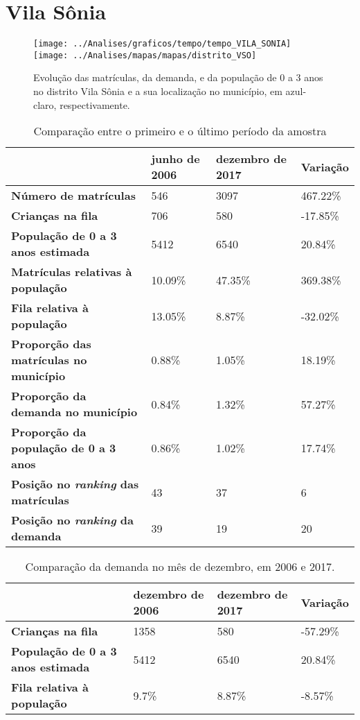 \section{Vila Sônia}
\begin{figure}[H]
\centering
\texttt{[image: ../Analises/graficos/tempo/tempo\_VILA\_SONIA]}
\texttt{[image: ../Analises/mapas/mapas/distrito\_VSO]}
\caption{Evolução das matrículas, da demanda, e da população de 0 a 3 anos no distrito Vila Sônia e a sua localização no município, em azul-claro, respectivamente.}
\end{figure}
\begin{table}[H]
\begin{tabular}{l|l|l|l}
\textbf{}                                      & \textbf{junho de 2006}       & \textbf{dezembro de 2017}    & \textbf{Variação} \\ \hline
\textbf{Número de matrículas}                  & 546 & 3097 & 467.22\% \\ \hline
\textbf{Crianças na fila}                      & 706 & 580 & -17.85\% \\ \hline
\textbf{População de 0 a 3 anos estimada}      & 5412 & 6540 & 20.84\% \\ \hline
\textbf{Matrículas relativas à população}      & 10.09\% & 47.35\% & 369.38\% \\ \hline
\textbf{Fila relativa à população}             & 13.05\% & 8.87\% & -32.02\% \\ \hline
\textbf{Proporção das matrículas no município} & 0.88\% & 1.05\% & 18.19\% \\ \hline
\textbf{Proporção da demanda no município}     & 0.84\% & 1.32\% & 57.27\% \\ \hline
\textbf{Proporção da população de 0 a 3 anos}  & 0.86\% & 1.02\% & 17.74\% \\ \hline
\textbf{Posição no \textit{ranking} das matrículas}     & 43 & 37 & 6 \\ \hline
\textbf{Posição no \textit{ranking} da demanda}         & 39 & 19 & 20 \\ 
\end{tabular}
\caption{Comparação entre o primeiro e o último período da amostra}
\end{table}
\begin{table}[H]
\begin{tabular}{l|l|l|l}
\textbf{}                                 & \textbf{dezembro de 2006} & \textbf{dezembro de 2017} & \textbf{Variação} \\ \hline
\textbf{Crianças na fila}                      & 1358 & 580 & -57.29\% \\ \hline
\textbf{População de 0 a 3 anos estimada}      & 5412 & 6540 & 20.84\% \\ \hline
\textbf{Fila relativa à população}             & 9.7\% & 8.87\% & -8.57\% \\
\end{tabular}
\caption{Comparação da demanda no mês de dezembro, em 2006 e 2017.}
\end{table}